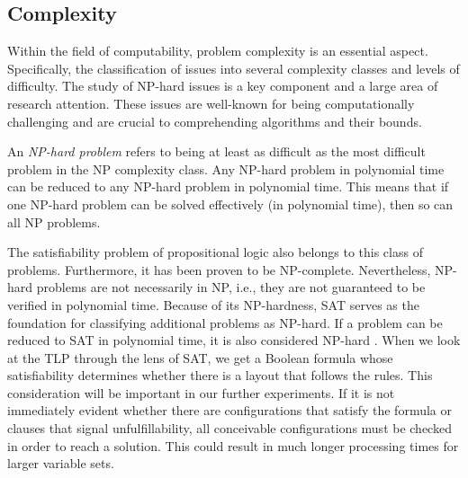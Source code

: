 \documentclass[bachelor, english]{algothesis}
\begin{document}
\subsection{Complexity}
Within the field of computability, problem complexity is an essential aspect. Specifically, the classification of issues into several complexity classes and levels of difficulty. The study of NP-hard issues is a key component and a large area of research attention. These issues are well-known for being computationally challenging and are crucial to comprehending algorithms and their bounds.

\begin{definition}
    An \emph{NP-hard problem} refers to being at least as difficult as the most difficult problem in the NP complexity class. Any NP-hard problem in polynomial time can be reduced to any NP-hard problem in polynomial time. This means that if one NP-hard problem can be solved effectively (in polynomial time), then so can all NP problems.
\end{definition}
\noindent
The satisfiability problem of propositional logic also belongs to this class of problems. Furthermore, it has been proven to be NP-complete. Nevertheless, NP-hard problems are not necessarily in NP, i.e., they are not guaranteed to be verified in polynomial time. Because of its NP-hardness, SAT serves as the foundation for classifying additional problems as NP-hard. If a problem can be reduced to SAT in polynomial time, it is also considered NP-hard \cite{SAT_Complexity}. \newline
When we look at the TLP through the lens of SAT, we get a Boolean formula whose satisfiability determines whether there is a layout that follows the rules. This consideration will be important in our further experiments. If it is not immediately evident whether there are configurations that satisfy the formula or clauses that signal unfulfillability, all conceivable configurations must be checked in order to reach a solution. This could result in much longer processing times for larger variable sets.
\end{document}
